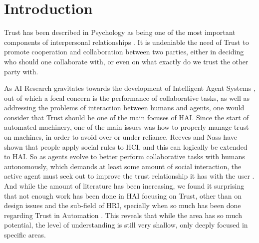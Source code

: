\section{Introduction}
\label{sec:Introduction}

Trust has been described in Psychology as being one of the most important components of interpersonal relationships \cite{Simpson2007}. It is undeniable the need of Trust to promote cooperation and collaboration between two parties, either in deciding who should one collaborate with, or even on what exactly do we trust the other party with. 


As \ac{AI} Research gravitates towards the development of Intelligent Agent Systems \cite{Russell2009a}, out of which a focal concern is the performance of collaborative tasks\cite{Grosz1996, Allen2002, Allen2007}, as well as addressing the problems of interaction between humans and agents\cite{Bradshaw2011}, one would consider that Trust should be one of the main focuses of \ac{HAI}. Since the start of automated machinery, one of the main issues was how to properly manage trust on machines, in order to avoid over or under reliance\cite{Lee2004}. Reeves and Nass have shown that people apply social rules to \ac{HCI}, and this can logically be extended to \ac{HAI}\cite{Reeves1998a}. So as agents evolve to better perform collaborative tasks with humans autonomously, which demands at least some amount of social interaction, the active agent must seek out to improve the trust relationship it has with the user \cite{Lashkari1994}. And while the amount of literature has been increasing, we found it surprising that not enough work has been done in \ac{HAI} focusing on Trust, other than on design issues\cite{Bickmore2005} and the sub-field of \ac{HRI}\cite{Goodrich2007, VandenBrule2014}, specially when so much has been done regarding Trust in Automation \cite{Lee1992, Jones1997, Lee2004}. This reveals that while the area has so much potential, the level of understanding is still very shallow, only deeply focused in specific areas.

